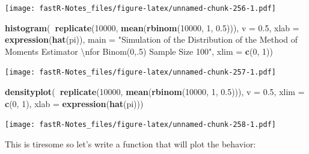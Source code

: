 \documentclass[]{book}
\newenvironment{Shaded}{\begin{snugshade}}{\end{snugshade}}
\newcommand{\KeywordTok}[1]{\textcolor[rgb]{0.13,0.29,0.53}{\textbf{#1}}}
\newcommand{\DataTypeTok}[1]{\textcolor[rgb]{0.13,0.29,0.53}{#1}}
\newcommand{\DecValTok}[1]{\textcolor[rgb]{0.00,0.00,0.81}{#1}}
\newcommand{\FloatTok}[1]{\textcolor[rgb]{0.00,0.00,0.81}{#1}}
\newcommand{\CharTok}[1]{\textcolor[rgb]{0.31,0.60,0.02}{#1}}
\newcommand{\StringTok}[1]{\textcolor[rgb]{0.31,0.60,0.02}{#1}}
\newcommand{\OperatorTok}[1]{\textcolor[rgb]{0.81,0.36,0.00}{\textbf{#1}}}
\newcommand{\NormalTok}[1]{#1}
\theoremstyle{definition}
\theoremstyle{definition}
\theoremstyle{definition}
\theoremstyle{remark}
\begin{document}
\texttt{[image: fastR-Notes\_files/figure-latex/unnamed-chunk-256-1.pdf]}

\begin{Shaded}
\begin{Highlighting}[]
\KeywordTok{histogram}\NormalTok{(}\OperatorTok{~}\KeywordTok{replicate}\NormalTok{(}\DecValTok{10000}\NormalTok{, }\KeywordTok{mean}\NormalTok{(}\KeywordTok{rbinom}\NormalTok{(}\DecValTok{10000}\NormalTok{, }\DecValTok{1}\NormalTok{, }\FloatTok{0.5}\NormalTok{))), }\DataTypeTok{v =} \FloatTok{0.5}\NormalTok{, }\DataTypeTok{xlab =} \KeywordTok{expression}\NormalTok{(}\KeywordTok{hat}\NormalTok{(pi)), }
    \DataTypeTok{main =} \StringTok{"Simulation of the Distribution of the Method of Moments Estimator }\CharTok{\textbackslash{}n}\StringTok{for Binom(0,.5) Sample Size 100"}\NormalTok{, }
    \DataTypeTok{xlim =} \KeywordTok{c}\NormalTok{(}\DecValTok{0}\NormalTok{, }\DecValTok{1}\NormalTok{))}
\end{Highlighting}
\end{Shaded}

\texttt{[image: fastR-Notes\_files/figure-latex/unnamed-chunk-257-1.pdf]}

\begin{Shaded}
\begin{Highlighting}[]
\KeywordTok{densityplot}\NormalTok{(}\OperatorTok{~}\KeywordTok{replicate}\NormalTok{(}\DecValTok{10000}\NormalTok{, }\KeywordTok{mean}\NormalTok{(}\KeywordTok{rbinom}\NormalTok{(}\DecValTok{10000}\NormalTok{, }\DecValTok{1}\NormalTok{, }\FloatTok{0.5}\NormalTok{))), }\DataTypeTok{v =} \FloatTok{0.5}\NormalTok{, }\DataTypeTok{xlim =} \KeywordTok{c}\NormalTok{(}\DecValTok{0}\NormalTok{, }
    \DecValTok{1}\NormalTok{), }\DataTypeTok{xlab =} \KeywordTok{expression}\NormalTok{(}\KeywordTok{hat}\NormalTok{(pi)))}
\end{Highlighting}
\end{Shaded}

\texttt{[image: fastR-Notes\_files/figure-latex/unnamed-chunk-258-1.pdf]}

This is tiresome so let's write a function that will plot the behavior:
\end{document}
